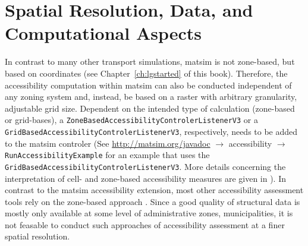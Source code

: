 

\section{Spatial Resolution, Data, and Computational Aspects}
\label{sec:spatial}
In contrast to many other transport simulations, \gls{matsim} is not zone-based, but based on coordinates (see 
Chapter~\ref{ch:lgstarted} of this book). Therefore, the accessibility computation within \gls{matsim} can also
be conducted independent of any zoning system and, instead, be based on a raster with arbitrary granularity,
\ie adjustable grid size. Dependent on the intended type of calculation (zone-based or grid-bases), a 
\lstinline{ZoneBasedAccessibilityControlerListenerV3} or a 
\lstinline{GridBasedAccessibilityControlerListenerV3}, respectively, needs to be added to the \gls{matsim} controler 
(See \url{http://matsim.org/javadoc} $\to$ accessibility $\to$ \lstinline{RunAccessibilityExample} for an example
that uses the \lstinline{GridBasedAccessibilityControlerListenerV3}. More details concerning the interpretation
of cell- and zone-based accessibility measures are given in \citet{NicolaiNagelHiResAccessibilityMethod}).
In contrast to the \gls{matsim} accessibility extension, most other accessibility assessment tools
rely on the zone-based approach 
\citep{CurtisEtAl2013AccessibilityPolicyInnovation, LiuZhu2004AccessibilityAnalyst, BuettnerEtAl2010Erreichbarkeitsatlas}.
Since a good quality of structural data is mostly only available at some level of administrative zones, 
\eg municipalities, it is not feasable to conduct such approaches of accessibility assessment at a finer 
spatial resolution.

